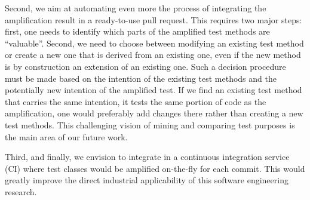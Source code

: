 Second, we aim at automating even more the process of integrating the amplification result in a ready-to-use pull request. This requires two major steps: first, one needs to identify which parts of the amplified test methods are ``valuable''. 
Second, we need to choose between modifying an existing test method or create a new one that is derived from an existing one, even if the new method is by construction an extension of an existing one. 
Such a decision procedure must be made based on the intention of the existing test methods and the potentially new intention of the amplified test. If we find an existing test method that carries the same intention, \ie it tests the same portion of code as the amplification, one would preferably add changes there rather than creating a new test methods. This challenging vision of mining and comparing test purposes is the main area of our future work.

Third, and finally, we envision to integrate \dspot in a continuous integration service (CI) where test classes would be amplified on-the-fly for each commit. This would greatly improve the direct industrial applicability of this software engineering research.